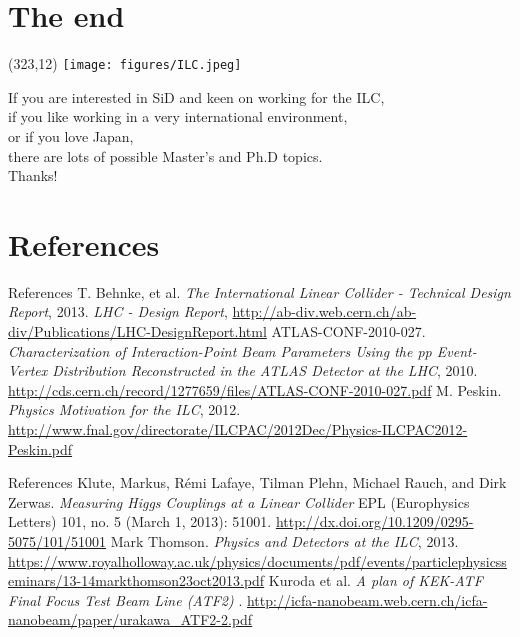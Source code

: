 \documentclass[xcolor={dvipsnames}]{beamer}
\newcommand{\ilclogo}{
  \setlength{\TPHorizModule}{1pt}
  \setlength{\TPVertModule}{1pt}
  \begin{textblock}{1}(323,12)
   \texttt{[image: figures/ILC.jpeg]}
  \end{textblock}
}
\begin{document}
\section*{The end}
{
\begin{frame}
\ilclogo
\begin{center}
If you are interested in SiD and keen on working for the ILC, \\
if you like working in a very international environment, \\
or if you love Japan,\\
there are lots of possible Master's and Ph.D topics.\\
\vspace*{1cm}
\textcolor{RubineRed}{
	\LARGE Thanks!
}
\end{center}
\end{frame}
}

\section*{References}
\begin{thebibliography}{9}
\begin{frame}{References}
 T. Behnke, et al.
\emph{The International Linear Collider - Technical Design Report}, 2013.
 \emph{LHC - Design Report}, \url{http://ab-div.web.cern.ch/ab-div/Publications/LHC-DesignReport.html}
 ATLAS-CONF-2010-027. \emph{Characterization of Interaction-Point Beam Parameters Using the pp Event-Vertex Distribution Reconstructed in the ATLAS Detector at the LHC}, 2010. \url{http://cds.cern.ch/record/1277659/files/ATLAS-CONF-2010-027.pdf}
 M. Peskin. \emph{Physics Motivation for the ILC}, 2012. \url{http://www.fnal.gov/directorate/ILCPAC/2012Dec/Physics-ILCPAC2012-Peskin.pdf}
\end{frame}
\begin{frame}{References}
 Klute, Markus, Rémi Lafaye, Tilman Plehn, Michael Rauch, and
Dirk Zerwas. \emph{Measuring Higgs Couplings at a Linear Collider}
EPL (Europhysics Letters) 101, no. 5 (March 1, 2013): 51001. \url{http://dx.doi.org/10.1209/0295-5075/101/51001}
 Mark Thomson. \emph{Physics and Detectors at the ILC}, 2013. \url{https://www.royalholloway.ac.uk/physics/documents/pdf/events/particlephysicsseminars/13-14markthomson23oct2013.pdf}
 Kuroda et al. \emph{A plan of KEK-ATF Final Focus Test Beam Line (ATF2)
}. \url{http://icfa-nanobeam.web.cern.ch/icfa-nanobeam/paper/urakawa_ATF2-2.pdf}

\end{frame}
\end{thebibliography}
\end{document}
